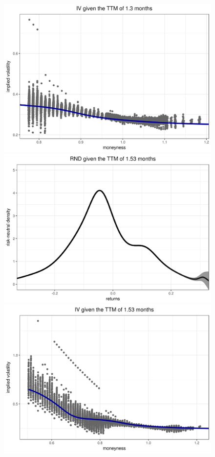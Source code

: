 \documentclass[a4paper,12pt]{article}
\theoremstyle{plain}
\theoremstyle{definition}
\begin{document}
\begin{figure}[H]
\begin{center}
 \endminipage
 \hspace{3mm}
 \includegraphics[width=\linewidth]{figures/hour_7th/GOOG_20150105_iv_smile_7th_hour_ttm_1_3.png}
 \endminipage\\
 \includegraphics[width=\linewidth]{figures/hour_7th/GOOG_20150105_rnd_ci_7th_hour_ttm_1_53.png}
 \endminipage
 \hspace{3mm}
 \includegraphics[width=\linewidth]{figures/hour_7th/GOOG_20150105_iv_smile_7th_hour_ttm_1_53.png}

\end{center}
\end{figure}
\end{document}
